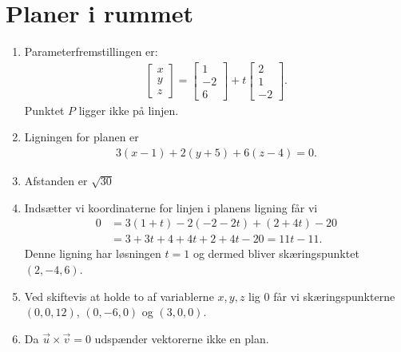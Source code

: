 \section{Planer i rummet}
\begin{enumerate}
	\item Parameterfremstillingen er:
	\begin{align*}
	\begin{bmatrix}
	x\\y\\z
	\end{bmatrix}=\begin{bmatrix}
	1\\-2\\6
	\end{bmatrix}+t \begin{bmatrix}
	2\\1\\-2
	\end{bmatrix}.
	\end{align*}
	Punktet $P$ ligger ikke på linjen.
	
	\item Ligningen for planen er
	\begin{align*}
	3(x-1)+2(y+5)+6(z-4)=0.
	\end{align*}
	
	\item Afstanden er $\sqrt{30}$
	
	\item Indsætter vi koordinaterne for linjen i planens ligning får vi
	\begin{align*}
	0&=3(1+t)-2(-2-2t)+(2+4t)-20\\&=3+3t+4+4t+2+4t-20=11t-11.
	\end{align*}
	Denne ligning har løsningen $t=1$ og dermed bliver skæringspunktet $(2,-4,6)$.
	
	\item Ved skiftevis at holde to af variablerne $x,y,z$ lig $0$ får vi skæringspunkterne $(0,0,12)$, $(0,-6,0)$ og $(3,0,0)$.

	
	\item Da $\vec{u}\times \vec{v}=0$ udspænder vektorerne ikke en plan.
	

\end{enumerate}
